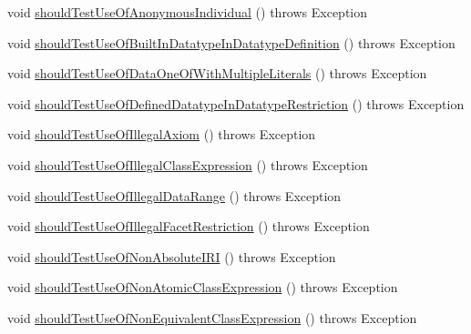 \begin{DoxyCompactItemize}
\item 
void \hyperlink{classorg_1_1semanticweb_1_1owlapi_1_1contract_1_1_contract_owlapi_profiles_test_a7172f72409dd03a14324a83d4e66f5f0}{should\-Test\-Use\-Of\-Anonymous\-Individual} ()  throws Exception 
\item 
void \hyperlink{classorg_1_1semanticweb_1_1owlapi_1_1contract_1_1_contract_owlapi_profiles_test_a26c381e18edab222c1aae78b91caeb6f}{should\-Test\-Use\-Of\-Built\-In\-Datatype\-In\-Datatype\-Definition} ()  throws Exception 
\item 
void \hyperlink{classorg_1_1semanticweb_1_1owlapi_1_1contract_1_1_contract_owlapi_profiles_test_a699dd4e69ff0c0b03b4245c6c0f69a02}{should\-Test\-Use\-Of\-Data\-One\-Of\-With\-Multiple\-Literals} ()  throws Exception 
\item 
void \hyperlink{classorg_1_1semanticweb_1_1owlapi_1_1contract_1_1_contract_owlapi_profiles_test_aebc8d1e1ef84cb01e164425887cbf147}{should\-Test\-Use\-Of\-Defined\-Datatype\-In\-Datatype\-Restriction} ()  throws Exception 
\item 
void \hyperlink{classorg_1_1semanticweb_1_1owlapi_1_1contract_1_1_contract_owlapi_profiles_test_a33ac4935ab21aad10ce4235d05c2f818}{should\-Test\-Use\-Of\-Illegal\-Axiom} ()  throws Exception 
\item 
void \hyperlink{classorg_1_1semanticweb_1_1owlapi_1_1contract_1_1_contract_owlapi_profiles_test_a0aae8c28df5848a4c2179341fc14a947}{should\-Test\-Use\-Of\-Illegal\-Class\-Expression} ()  throws Exception 
\item 
void \hyperlink{classorg_1_1semanticweb_1_1owlapi_1_1contract_1_1_contract_owlapi_profiles_test_ab00f995a92cc2ff7142a91ce7ec74635}{should\-Test\-Use\-Of\-Illegal\-Data\-Range} ()  throws Exception 
\item 
void \hyperlink{classorg_1_1semanticweb_1_1owlapi_1_1contract_1_1_contract_owlapi_profiles_test_a0235e9699ceaa0b18aa6f7a8ec9b9b78}{should\-Test\-Use\-Of\-Illegal\-Facet\-Restriction} ()  throws Exception 
\item 
void \hyperlink{classorg_1_1semanticweb_1_1owlapi_1_1contract_1_1_contract_owlapi_profiles_test_ae367ab8d17208f93a6fedf63d36898e7}{should\-Test\-Use\-Of\-Non\-Absolute\-I\-R\-I} ()  throws Exception 
\item 
void \hyperlink{classorg_1_1semanticweb_1_1owlapi_1_1contract_1_1_contract_owlapi_profiles_test_aed1d817cc9d44727096c0da182e5e8d4}{should\-Test\-Use\-Of\-Non\-Atomic\-Class\-Expression} ()  throws Exception 
\item 
void \hyperlink{classorg_1_1semanticweb_1_1owlapi_1_1contract_1_1_contract_owlapi_profiles_test_ab2961b2ecdf87b20492d04123baa4532}{should\-Test\-Use\-Of\-Non\-Equivalent\-Class\-Expression} ()  throws Exception 

\end{DoxyCompactItemize}
